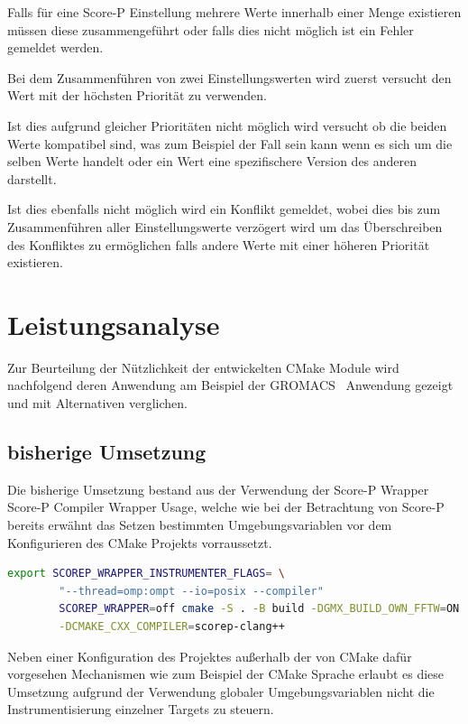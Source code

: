 \documentclass[german,proseminar,hyperref,utf8]{zihpub}
\begin{document}
    Falls für eine Score-P Einstellung mehrere Werte innerhalb einer Menge existieren müssen diese
    zusammengeführt oder falls dies nicht möglich ist ein Fehler gemeldet werden.

    Bei dem Zusammenführen von zwei Einstellungswerten wird zuerst versucht den Wert mit der höchsten
    Priorität zu verwenden.

    Ist dies aufgrund gleicher Prioritäten nicht möglich wird versucht ob die beiden Werte kompatibel
    sind, was zum Beispiel der Fall sein kann wenn es sich um die selben Werte handelt oder ein
    Wert eine spezifischere Version des anderen darstellt.

    Ist dies ebenfalls nicht möglich wird ein Konflikt gemeldet, wobei dies bis zum Zusammenführen
    aller Einstellungswerte verzögert wird um das Überschreiben des Konfliktes zu ermöglichen falls
    andere Werte mit einer höheren Priorität existieren.


    \newpage
    \section{Leistungsanalyse}
    Zur Beurteilung der Nützlichkeit der entwickelten CMake Module wird nachfolgend deren Anwendung
    am Beispiel der GROMACS~\cite{gromacs} Anwendung gezeigt und mit Alternativen verglichen.

    \subsection{bisherige Umsetzung}
    Die bisherige Umsetzung bestand aus der Verwendung der Score-P Wrapper~
    {Score-P Compiler Wrapper Usage}, welche wie bei der Betrachtung von Score-P bereits erwähnt das
    Setzen bestimmten Umgebungsvariablen vor dem Konfigurieren des CMake Projekts vorraussetzt.

    \begin{lstlisting}[language=bash, caption=Anwendung eines Score-P Wrapper bei GROMACS, gobble=8, showstringspaces=false, basicstyle=\small]
        export SCOREP_WRAPPER_INSTRUMENTER_FLAGS= \
        "--thread=omp:ompt --io=posix --compiler"
        SCOREP_WRAPPER=off cmake -S . -B build -DGMX_BUILD_OWN_FFTW=ON \
        -DCMAKE_CXX_COMPILER=scorep-clang++
    \end{lstlisting}

    Neben einer Konfiguration des Projektes außerhalb der von CMake dafür vorgesehen Mechanismen
    wie zum Beispiel der CMake Sprache erlaubt es diese Umsetzung aufgrund der Verwendung globaler
    Umgebungsvariablen nicht die Instrumentisierung einzelner Targets zu steuern.
\end{document}
